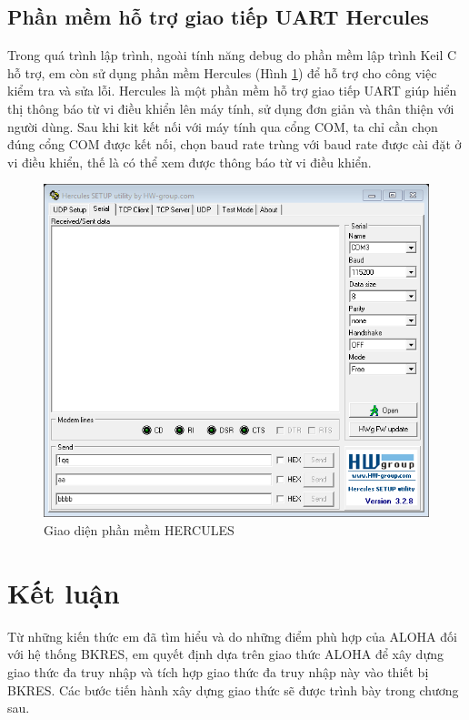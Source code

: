 \subsection{Phần mềm hỗ trợ giao tiếp UART Hercules} 
Trong quá trình lập trình, ngoài tính năng debug do phần mềm lập trình Keil C hỗ trợ, em còn sử dụng phần mềm Hercules (Hình \ref{refhinh2_17}{}) để hỗ trợ cho công việc kiểm tra và sửa lỗi. Hercules là một phần mềm hỗ trợ giao tiếp UART giúp hiển thị thông báo từ vi điều khiển lên máy tính, sử dụng đơn giản và thân thiện với người dùng. Sau khi kit kết nối với máy tính qua cổng COM, ta chỉ cần chọn đúng cổng COM được kết nối, chọn baud rate trùng với baud rate được cài đặt ở vi điều khiển, thế là có thể xem được thông báo từ vi điều khiển.\\
\begin{figure}[h]
\centering
\includegraphics[scale=0.5]{image/hinh2_17}
\caption{Giao diện phần mềm HERCULES}
\label{refhinh2_17}
\end{figure}
\section{Kết luận}	
Từ những kiến thức em đã tìm hiểu và do những điểm phù hợp của ALOHA đối với hệ thống BKRES, em quyết định dựa trên giao thức ALOHA để xây dựng giao thức đa truy nhập và tích hợp giao thức đa truy nhập này vào thiết bị BKRES. Các bước tiến hành xây dựng giao thức sẽ được trình bày trong chương sau.





